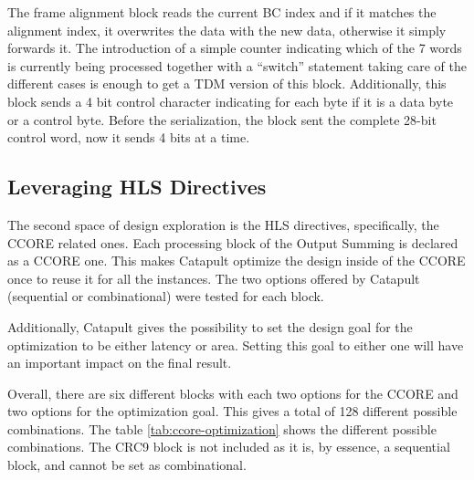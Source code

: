 The frame alignment block reads the current BC index and if it matches the alignment index, it overwrites the data with the new data, otherwise it simply forwards it. The introduction of a simple counter indicating which of the 7 words is currently being processed together with a ``switch'' statement taking care of the different cases is enough to get a TDM version of this block. Additionally, this block sends a 4 bit control character indicating for each byte if it is a data byte or a control byte. Before the serialization, the block sent the complete 28-bit control word, now it sends 4 bits at a time.


\subsection{Leveraging HLS Directives}

The second space of design exploration is the HLS directives, specifically, the CCORE related ones. Each processing block of the Output Summing is declared as a CCORE one. This makes Catapult optimize the design inside of the CCORE once to reuse it for all the instances. The two options offered by Catapult (sequential or combinational) were tested for each block.

Additionally, Catapult gives the possibility to set the design goal for the optimization to be either latency or area. Setting this goal to either one will have an important impact on the final result.

Overall, there are six different blocks with each two options for the CCORE and two options for the optimization goal. This gives a total of 128 different possible combinations. The table \ref{tab:ccore-optimization} shows the different possible combinations. The CRC9 block is not included as it is, by essence, a sequential block, and cannot be set as combinational.

